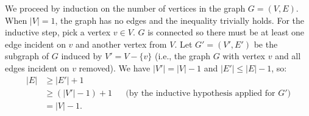 We proceed by induction on the number of vertices in the graph $G=(V,E)$.
When $|V|=1$, the graph has no edges and the inequality trivially holds.
For the inductive step, pick a vertex $v\in V$.
$G$ is connected so there must be at least one edge incident on $v$ and another vertex from $V$.
Let $G'=(V',E')$ be the subgraph of $G$ induced by $V'=V-\{v\}$ (i.e., the graph $G$ with vertex $v$ and all edges incident on $v$ removed).
We have $|V'|=|V|-1$ and $|E'|\le |E|-1$, so:
\begin{align*}
    |E| &\ge |E'|+1 \\
    &\ge (|V'|-1)+1 && \text{(by the inductive hypothesis applied for $G'$)} \\
    &= |V|-1.
\end{align*}
